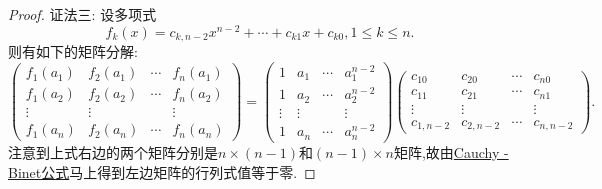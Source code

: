 \documentclass[../../main.tex]{subfiles}%
\begin{document}
\begin{proof}
{\color{blue}证法三:}
设多项式
\[
f_k(x)=c_{k,n - 2}x^{n - 2}+\cdots+c_{k1}x + c_{k0},1\leqslant  k\leqslant  n.
\]
则有如下的矩阵分解:
\[
\begin{pmatrix}
f_1(a_1) & f_2(a_1) & \cdots & f_n(a_1)\\
f_1(a_2) & f_2(a_2) & \cdots & f_n(a_2)\\
\vdots & \vdots & & \vdots\\
f_1(a_n) & f_2(a_n) & \cdots & f_n(a_n)
\end{pmatrix}
=
\begin{pmatrix}
1 & a_1 & \cdots & a_1^{n - 2}\\
1 & a_2 & \cdots & a_2^{n - 2}\\
\vdots & \vdots & & \vdots\\
1 & a_n & \cdots & a_n^{n - 2}
\end{pmatrix}
\begin{pmatrix}
c_{10} & c_{20} & \cdots & c_{n0}\\
c_{11} & c_{21} & \cdots & c_{n1}\\
\vdots & \vdots & & \vdots\\
c_{1,n - 2} & c_{2,n - 2} & \cdots & c_{n,n - 2}
\end{pmatrix}.
\]
注意到上式右边的两个矩阵分别是\(n\times(n - 1)\)和\((n - 1)\times n\)矩阵,故由\hyperref[theorem:Cauchy-Binet公式]{Cauchy - Binet公式}马上得到左边矩阵的行列式值等于零.

\end{proof}
\end{document}

